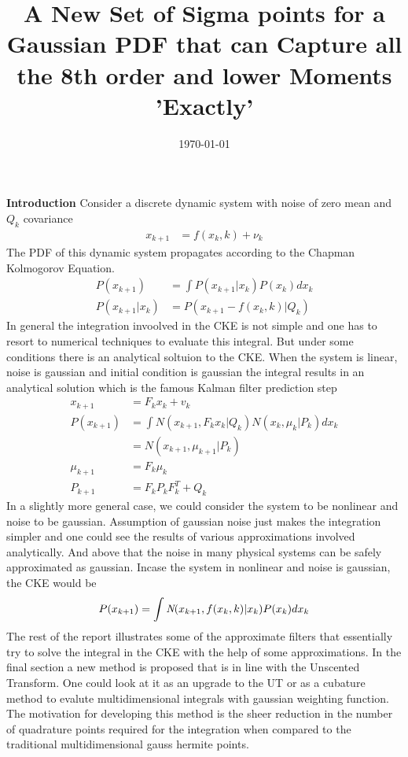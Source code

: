 \documentclass{article}
\title{A New Set of Sigma points for a Gaussian PDF that can Capture all the 8th order and lower Moments 'Exactly'}
\date{\today}
\begin{document}
\maketitle
{\bf Introduction}\newline\newline
Consider a discrete dynamic system with noise of zero mean and $Q_k$ covariance
\begin{align}
x_{k+1}&=f(x_k,k)+\nu_k
\end{align}
	The PDF of this dynamic system propagates according to the Chapman Kolmogorov Equation.
	\begin{align}
	P(x_{k+1})&=\int{P(x_{k+1}|x_k)P(x_k)}dx_k\\
	P(x_{k+1}|x_k)&=P(x_{k+1}-f(x_k,k)|Q_k)
	\end{align}
	In general the integration invoolved in the CKE is not simple and one has to resort to numerical techniques to evaluate this integral. But under some conditions there is an analytical soltuion to the CKE. When the system is linear, noise is gaussian and initial condition is gaussian the integral results in an analytical solution which is the famous Kalman filter prediction step 
	\begin{align}
	x_{k+1}&=F_kx_k+v_k\\
	P(x_{k+1})&=\int{N(x_{k+1},F_kx_k|Q_k)N(x_k,\mu_k|P_k)}dx_k\\
            &=N(x_{k+1},\mu_{k+1}|P_k)\\
   \mu_{k+1}&=F_k\mu_k\\
   P_{k+1}&=F_kP_kF_k^T+Q_k
	\end{align}
	In a slightly more general case, we could consider the system to be nonlinear and noise to be gaussian. Assumption of gaussian noise just makes the integration simpler and one could see the results of various approximations involved analytically. And above that the noise in many physical systems can be safely approximated as gaussian.\newline	
	Incase the system in nonlinear and noise is gaussian, the CKE would be
	\begin{align}
	P(x_{k+1})=\int{{\bf\emph{N}}(x_{k+1},f(x_k,k)|x_k)P(x_k)}dx_k
	\end{align}
	The rest of the report illustrates some of the approximate filters that essentially try to solve the integral in the CKE with the help of some approximations. In the final section a new method is proposed that is in line with the Unscented Transform. One could look at it as an upgrade to the UT or as a cubature method to evalute multidimensional integrals with gaussian weighting function. The motivation for developing this method is the sheer reduction in the number of quadrature points required for the integration when compared to the traditional multidimensional gauss hermite points.    
\end{document}
